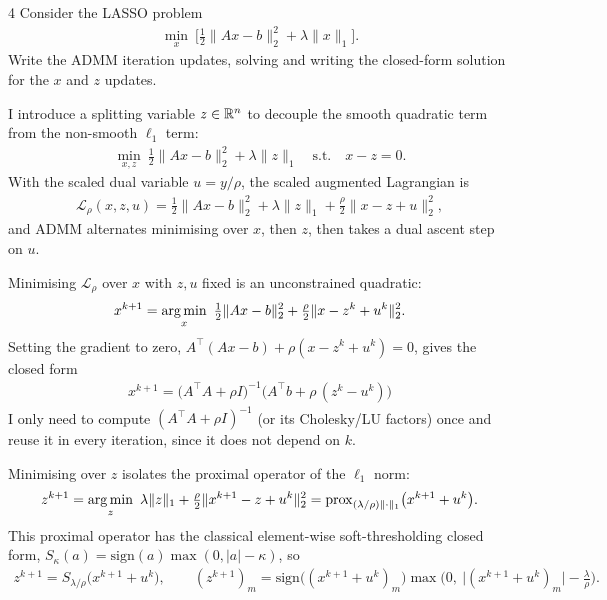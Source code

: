 \documentclass[a4paper, 11pt]{article}
\begin{document}
\begin{problem}{4}
Consider the LASSO problem
\begin{align*}
    \min_x\ \Big[\tfrac12\|Ax-b\|_2^2+\lambda\|x\|_1\Big].
\end{align*}
Write the ADMM iteration updates, solving and writing the closed-form solution for the $x$ and $z$ updates.
\end{problem}
\begin{solution}
I introduce a splitting variable $z\in\mathbb{R}^n$ to decouple the smooth quadratic term from the non-smooth $\ell_1$ term:
\begin{align*}
    \min_{x,z}\ \tfrac12\|Ax-b\|_2^2+\lambda\|z\|_1 \quad\text{s.t.}\quad x-z=0.
\end{align*}
With the scaled dual variable $u=y/\rho$, the scaled augmented Lagrangian is
\begin{align*}
    \mathcal{L}_\rho(x,z,u)=\tfrac12\|Ax-b\|_2^2+\lambda\|z\|_1+\tfrac\rho2\|x-z+u\|_2^2,
\end{align*}
and ADMM alternates minimising over $x$, then $z$, then takes a dual ascent step on $u$.

Minimising $\mathcal{L}_\rho$ over $x$ with $z,u$ fixed is an unconstrained quadratic:
\begin{align*}
    x^{k+1}=\argmin_x\ \tfrac12\|Ax-b\|_2^2+\tfrac\rho2\|x-z^k+u^k\|_2^2.
\end{align*}
Setting the gradient to zero, $A^\top(Ax-b)+\rho(x-z^k+u^k)=0$, gives the closed form
\begin{align*}
    \boxed{x^{k+1}=\big(A^\top A+\rho I\big)^{-1}\Big(A^\top b+\rho\,(z^k-u^k)\Big)}
\end{align*}
I only need to compute $(A^\top A+\rho I)^{-1}$ (or its Cholesky/LU factors) once and reuse it in every iteration, since it does not depend on $k$.

Minimising over $z$ isolates the proximal operator of the $\ell_1$ norm:
\begin{align*}
    z^{k+1}=\argmin_z\ \lambda\|z\|_1+\tfrac\rho2\|x^{k+1}-z+u^k\|_2^2=\mathrm{prox}_{(\lambda/\rho)\|\cdot\|_1}\big(x^{k+1}+u^k\big).
\end{align*}
This proximal operator has the classical element-wise soft-thresholding closed form, $S_\kappa(a)=\mathrm{sign}(a)\max(0,|a|-\kappa)$, so
\begin{align*}
    \boxed{z^{k+1}=S_{\lambda/\rho}\big(x^{k+1}+u^k\big)}, \qquad (z^{k+1})_m=\mathrm{sign}\big((x^{k+1}+u^k)_m\big)\max\Big(0,\ \big|(x^{k+1}+u^k)_m\big|-\frac\lambda\rho\Big).
\end{align*}


\end{solution}
\end{document}
